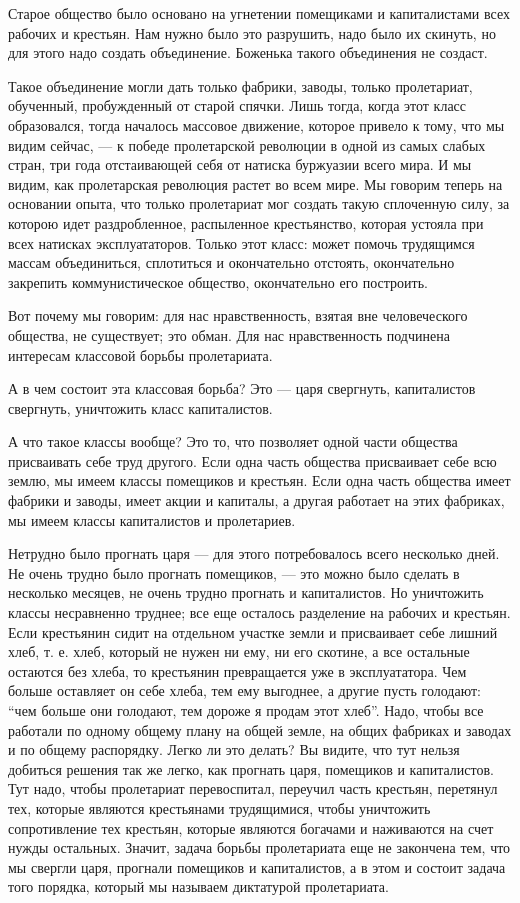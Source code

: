 \documentclass[12pt]{article}
\newcommand{\parnum}{(\arabic{parcount})}
\newcounter{parcount}
\newenvironment{parnumbers}{%
  \par%
  \everypar{\noindent \stepcounter{parcount}\marginpar[]{\parnum}}%
}{}
\begin{document}
\begin{parnumbers}
Старое общество было основано на угнетении помещиками и капиталистами всех рабочих и крестьян. Нам нужно было это разрушить, надо было их скинуть, но для этого надо создать объединение. Боженька такого объединения не создаст.

Такое объединение могли дать только фабрики, заводы, только пролетариат, обученный, пробужденный от старой спячки. Лишь тогда, когда этот класс образовался, тогда началось массовое движение, которое привело к тому, что мы видим сейчас, — к победе пролетарской революции в одной из самых слабых стран, три года отстаивающей себя от натиска буржуазии всего мира. И мы видим, как пролетарская революция растет во всем мире. Мы говорим теперь на основании опыта, что только пролетариат мог создать такую сплоченную силу, за которою идет раздробленное, распыленное крестьянство, которая устояла при всех натисках эксплуататоров. Только этот класс: может помочь трудящимся массам объединиться, сплотиться и окончательно отстоять, окончательно закрепить коммунистическое общество, окончательно его построить.

Вот почему мы говорим: для нас нравственность, взятая вне человеческого общества, не существует; это обман. Для нас нравственность подчинена интересам классовой борьбы пролетариата.

А в чем состоит эта классовая борьба? Это — царя свергнуть, капиталистов свергнуть, уничтожить класс капиталистов.

А что такое классы вообще? Это то, что позволяет одной части общества присваивать себе труд другого. Если одна часть общества присваивает себе всю землю, мы имеем классы помещиков и крестьян. Если одна часть общества имеет фабрики и заводы, имеет акции и капиталы, а другая работает на этих фабриках, мы имеем классы капиталистов и пролетариев.

Нетрудно было прогнать царя — для этого потребовалось всего несколько дней. Не очень трудно было прогнать помещиков, — это можно было сделать в несколько месяцев, не очень трудно прогнать и капиталистов. Но уничтожить классы несравненно труднее; все еще осталось разделение на рабочих и крестьян. Если крестьянин сидит на отдельном участке земли и присваивает себе лишний хлеб, т. е. хлеб, который не нужен ни ему, ни его скотине, а все остальные остаются без хлеба, то крестьянин превращается уже в эксплуататора. Чем больше оставляет он себе хлеба, тем ему выгоднее, а другие пусть голодают: “чем больше они голодают, тем дороже я продам этот хлеб”. Надо, чтобы все работали по одному общему плану на общей земле, на общих фабриках и заводах и по общему распорядку. Легко ли это делать? Вы видите, что тут нельзя добиться решения так же легко, как прогнать царя, помещиков и капиталистов. Тут надо, чтобы пролетариат перевоспитал, переучил часть крестьян, перетянул тех, которые являются крестьянами трудящимися, чтобы уничтожить сопротивление тех крестьян, которые являются богачами и наживаются на счет нужды остальных. Значит, задача борьбы пролетариата еще не закончена тем, что мы свергли царя, прогнали помещиков и капиталистов, а в этом и состоит задача того порядка, который мы называем диктатурой пролетариата.


\end{parnumbers}
\end{document}
